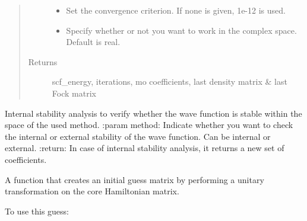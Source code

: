 \documentclass[letterpaper,10pt,english]{sphinxmanual}
\begin{document}
\begin{fulllineitems}
\begin{fulllineitems}
\begin{quote}
\begin{description}
\begin{itemize}
\item {} 
 \textendash{} Set the convergence criterion. If none is given, 1e-12 is used.

\item {} 
 \textendash{} Specify whether or not you want to work in the complex space. Default is real.

\end{itemize}

\item[{Returns}] \leavevmode
scf\_energy, iterations, mo coefficients, last density matrix \& last Fock matrix

\end{description}\end{quote}

\end{fulllineitems}


\begin{fulllineitems}
\label{\detokenize{GHF:hf.HartreeFock.GHF.MF.stability_analysis}}
Internal stability analysis to verify whether the wave function is stable within the space of the used method.
:param method: Indicate whether you want to check the internal or external stability of the wave function. Can
be internal or external.
:return: In case of internal stability analysis, it returns a new set of coefficients.

\end{fulllineitems}


\begin{fulllineitems}
\label{\detokenize{GHF:hf.HartreeFock.GHF.MF.unitary_rotation_guess}}
A function that creates an initial guess matrix by performing a unitary transformation on the core Hamiltonian
matrix.

To use this guess:


\end{fulllineitems}
\end{fulllineitems}
\end{document}
